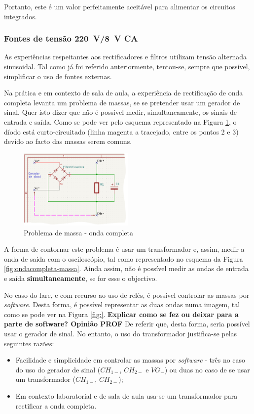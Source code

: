 Portanto, este é um valor perfeitamente aceitável para alimentar os circuitos integrados.

\subsubsection{Fontes de tensão \SI{220}{\volt}/\SI{8}{\volt} CA}
\label{sec:fontealternada}
As experiências respeitantes aos rectificadores e filtros utilizam tensão alternada sinusoidal. Tal como já foi referido anteriormente, tentou-se, sempre que possível, simplificar o uso de fontes externas. 

Na prática e em contexto de sala de aula, a experiência de rectificação de onda completa levanta um problema de massas, se se pretender usar um gerador de sinal. Quer isto dizer que não é possível medir, simultaneamente, os sinais de entrada e saída. Como se pode ver pelo esquema representado na Figura \ref{fig:gerador-massa}, o díodo está curto-circuitado (linha magenta a tracejado, entre os pontos 2 e 3) devido ao facto das massas serem comuns. 

\begin{figure}[hbtp]
	\centering
	\includegraphics[width=0.5\textwidth]{figures/sch_completa_CC.png}
	\caption{Problema de massa - onda completa}
	\label{fig:gerador-massa}
\end{figure}

A forma de contornar este problema é usar um transformador e, assim, medir a onda de saída com o osciloscópio, tal como representado no esquema da Figura \ref{fig:ondacompleta-massa}. Ainda assim, não é possível medir as ondas de entrada e saída \textbf{simultaneamente}, se for esse o objectivo.

No caso do \acrshort{lare}, e com recurso ao uso de relés, é possível controlar as massas por \textit{software}. Desta forma, é possível representar as duas ondas numa imagem, tal como se pode ver na Figura \ref{fig:}. \textbf{Explicar como se fez ou deixar para a parte de software? Opinião PROF}
De referir que, desta forma, seria possível usar o gerador de sinal. No entanto, o uso do transformador justifica-se pelas seguintes razões:
\begin{itemize}
	\item Facilidade e simplicidade em controlar as massas por \textit{software} - três no caso do uso do gerador de sinal ($CH_{1-}$, $CH_{2-}$ e $VG_{-}$) ou duas no caso de se usar um transformador ($CH_{1-}$, $CH_{2-}$);
	\item Em contexto laboratorial e de sala de aula usa-se um transformador para rectificar a onda completa.
\end{itemize}

